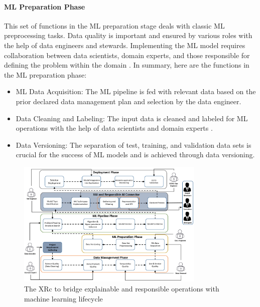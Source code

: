 \documentclass[conference]{IEEEtran}
\begin{document}
\paragraph{ML Preparation Phase} This set of functions in the ML preparation stage deals with classic ML preprocessing tasks. Data quality is important and ensured by various roles with the help of data engineers and stewards. Implementing the ML model requires collaboration between data scientists, domain experts, and those responsible for defining the problem within the domain \cite{treveil2020introducing}. In summary, here are the functions in the ML preparation phase:
\begin{itemize}
	\item ML Data Acquisition: The ML pipeline is fed with relevant data based on the prior declared data management plan and selection by the data engineer.
	\item Data Cleaning and Labeling: The input data is cleaned and labeled for ML operations with the help of data scientists and domain experts \cite{taleb2018big}.
	\item Data Versioning: The separation of test, training, and validation data sets is crucial for the success of ML models and is achieved through data versioning.
\end{itemize}

\begin{figure}[h!]
	\centering
	\includegraphics[width=0.8\textwidth]{ML-OPS_with_XAI.png}
	\caption{The XRc to bridge explainable and responsible operations with machine learning lifecycle}
	\label{XRc-phase}
\end{figure}
\end{document}
